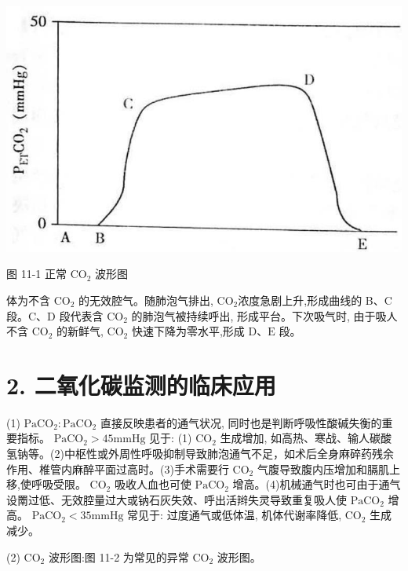 \documentclass[10pt]{article}
\begin{document}
\begin{center}
\includegraphics[max width=\textwidth]{2024_07_09_002a177993bd97d1d6d7g-118}
\end{center}

图 11-1 正常 $\mathrm{CO}_{2}$ 波形图

体为不含 $\mathrm{CO}_{2}$ 的无效腔气。随肺泡气排出, $\mathrm{CO}_{2}$浓度急剧上升,形成曲线的 B、C 段。C、D 段代表含 $\mathrm{CO}_{2}$ 的肺泡气被持续呼出, 形成平台。下次吸气时, 由于吸人不含 $\mathrm{CO}_{2}$ 的新鲜气, $\mathrm{CO}_{2}$ 快速下降为零水平,形成 $\mathrm{D} 、 \mathrm{E}$ 段。

\section*{2. 二氧化碳监测的临床应用}
(1) $\mathrm{PaCO}_{2}: \mathrm{PaCO}_{2}$ 直接反映患者的通气状况, 同时也是判断呼吸性酸碱失衡的重要指标。 $\mathrm{PaCO}_{2}>45 \mathrm{mmHg}$ 见于: (1) $\mathrm{CO}_{2}$ 生成增加, 如高热、寒战、输人碳酸氢钠等。(2)中枢性或外周性呼吸抑制导致肺泡通气不足，如术后全身麻碎药残余作用、椎管内麻醉平面过高时。(3)手术需要行 $\mathrm{CO}_{2}$ 气腹导致腹内压增加和膈肌上移,使呼吸受限。 $\mathrm{CO}_{2}$ 吸收人血也可使 $\mathrm{PaCO}_{2}$ 增高。(4)机械通气时也可由于通气设罱过低、无效腔量过大或钠石灰失效、呼出活辫失灵导致重复吸人使 $\mathrm{PaCO}_{2}$ 增高。 $\mathrm{PaCO}_{2}<35 \mathrm{mmHg}$ 常见于: 过度通气或低体温, 机体代谢率降低, $\mathrm{CO}_{2}$ 生成减少。

(2) $\mathrm{CO}_{2}$ 波形图:图 11-2 为常见的异常 $\mathrm{CO}_{2}$ 波形图。
\end{document}
